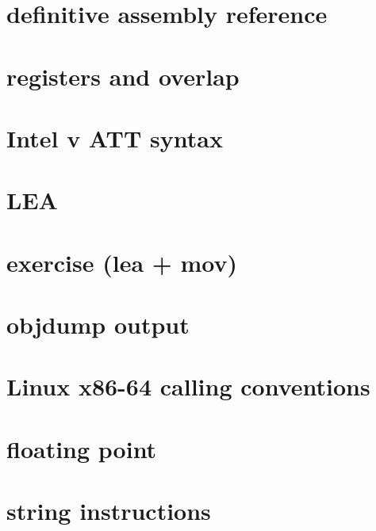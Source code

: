 \section{definitive assembly reference}



\section{registers and overlap}



\section{Intel v ATT syntax}



\section{LEA}


\section{exercise (lea + mov)}



\section{objdump output}


\section{Linux x86-64 calling conventions}



\section{floating point}




\section{string instructions}


